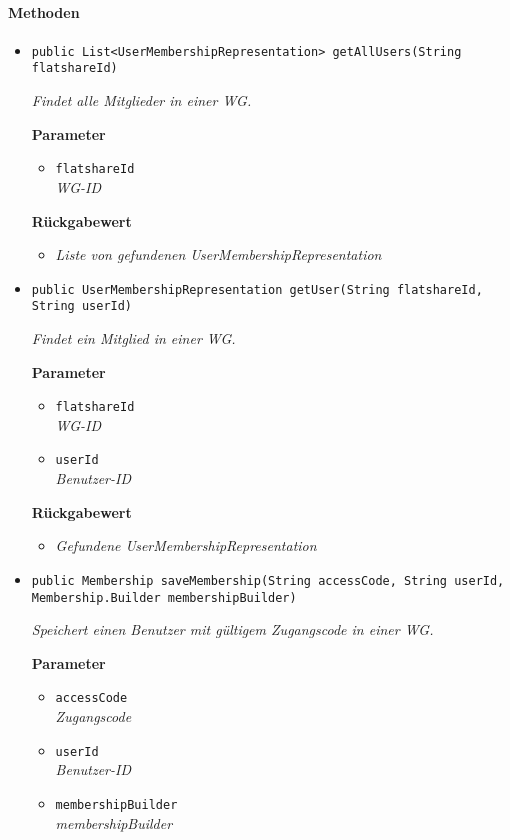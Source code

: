      \paragraph*{Methoden}
     \begin{itemize}
     	\item{\texttt{public List<UserMembershipRepresentation> getAllUsers(String flatshareId)}}
     	
     	\textit{Findet alle Mitglieder in einer WG.}
     	
     	\textbf{Parameter}
     	\begin{itemize}
     		\item\texttt{flatshareId}\\
     		\textit{WG-ID}
     	\end{itemize}
     	
     	\textbf{Rückgabewert} 
     	\begin{itemize}
     		\item\textit{Liste von gefundenen UserMembershipRepresentation}
     	\end{itemize}
     
     \item{\texttt{public UserMembershipRepresentation getUser(String flatshareId, String userId)}}
     	
     	\textit{Findet ein Mitglied in einer WG.}
     	
     	\textbf{Parameter}
     	\begin{itemize}
     		\item\texttt{flatshareId}\\
     		\textit{WG-ID}
     		\item\texttt{userId}\\
     		\textit{Benutzer-ID}
     	\end{itemize}
     	
     	\textbf{Rückgabewert}
     	\begin{itemize}
     		\item\textit{Gefundene UserMembershipRepresentation}
     	\end{itemize}
     
     \item{\texttt{public Membership saveMembership(String accessCode, String userId, Membership.Builder membershipBuilder)}}
     	
     	\textit{Speichert einen Benutzer mit gültigem Zugangscode in einer WG.}
     	
     	\textbf{Parameter}
     	\begin{itemize}
     		\item\texttt{accessCode}\\
     		\textit{Zugangscode}
     		\item\texttt{userId}\\
     		\textit{Benutzer-ID}
     		\item\texttt{membershipBuilder}\\
     		\textit{membershipBuilder}
     	\end{itemize}
     	

\end{itemize}
